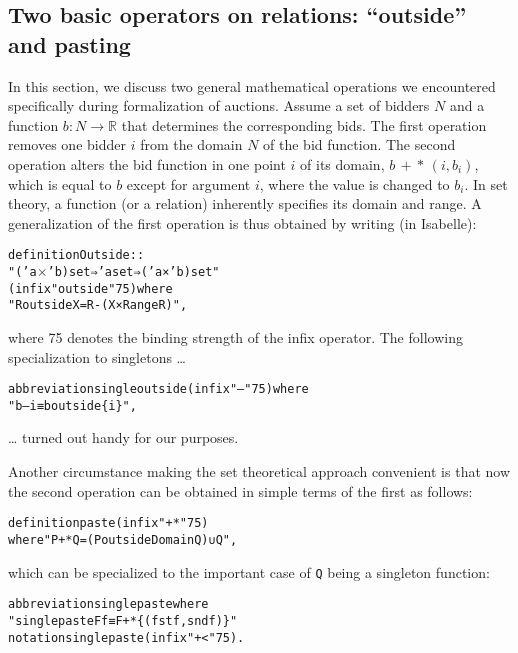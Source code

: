 \documentclass[
]{llncs}
\newenvironment{mytable}{
\vspace{0.2ex}
\begin{center}\begin{minipage}
{0.9\textwidth}\renewcommand{\baselinestretch}{0.75}\begin{small}}
{\end{small}\end{minipage}\end{center}
\vspace{0.1ex}
}
\newcommand{\I}{Isabelle}
\begin{document}
\subsection{Two basic operators on relations: “outside” and pasting}
\label{RefOutside}
In this section, we discuss two general mathematical operations we encountered specifically during formalization of auctions. Assume a set of bidders 
$N
$ and a function $b:N\to\mathbb{R}$ that determines the corresponding bids.
The first operation removes one bidder $i$ from the domain $N$ of the bid function.
The second operation alters the bid function in one point $i$ of its domain, $b\,+\!*\,(i,b_i)$, which is equal to $b$ except for argument $i$, where the value is changed to $b_i$.
In set theory, a function (or a relation) inherently specifies its domain and range.
A generalization of the first operation is thus obtained by writing (in \I):
\begin{mytable}
\begin{alltt}
definition Outside :: 
"('a \( \times \)  'b) set ⇒ 'a set ⇒ ('a × 'b) set" 
(infix "outside" 75) where 
"R outside X = R - (X × Range R)",
\end{alltt}
\end{mytable}
where 75 denotes the binding strength of the infix operator. The following specialization to singletons …
\begin{mytable}
\begin{alltt}
abbreviation singleoutside (infix "--" 75) where 
"b -- i ≡ b outside \{i\}",
\end{alltt}
\end{mytable}
… turned out handy for our purposes.

Another circumstance making the set theoretical approach convenient is that now the second operation can be obtained in simple terms of the first as follows:
\begin{mytable}
\begin{alltt}
definition paste (infix "+*" 75)
where "P +* Q = (P outside Domain Q) ∪ Q",
\end{alltt}
\end{mytable}
which can be specialized to the important case of \verb|Q| being a singleton function:
\begin{mytable}
\begin{alltt}
abbreviation singlepaste where 
"singlepaste F f ≡ F +* \{(fst f, snd f)\}"
notation singlepaste (infix "+<" 75).
\end{alltt}
\end{mytable}
\end{document}
